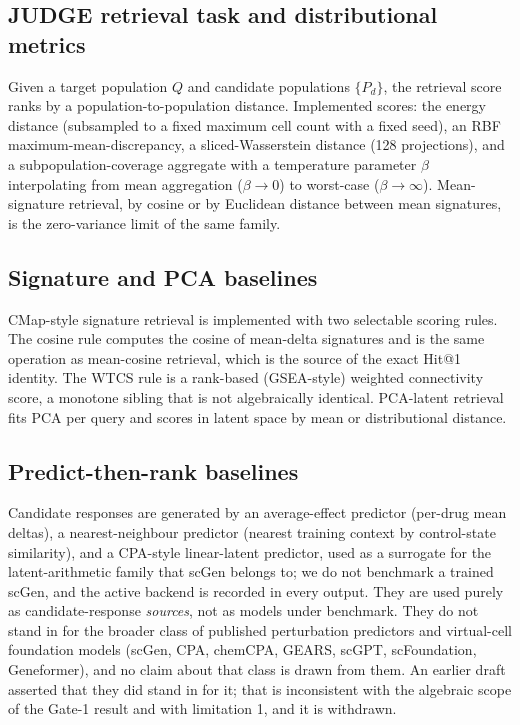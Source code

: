\documentclass[11pt,letterpaper]{article}
\begin{document}
\subsection*{JUDGE retrieval task and distributional metrics}

Given a target population $Q$ and candidate populations $\{P_d\}$, the retrieval score ranks by a
population-to-population distance. Implemented scores: the energy distance\cite{EnergyDistance} (subsampled to a fixed maximum cell
count with a fixed seed), an RBF maximum-mean-discrepancy\cite{MMD}, a
sliced-Wasserstein distance (128 projections)\cite{SlicedWasserstein}, and a
subpopulation-coverage aggregate with a temperature parameter $\beta$
interpolating from mean aggregation ($\beta \to 0$) to worst-case
($\beta \to \infty$). Mean-signature retrieval, by cosine or by Euclidean distance between
mean signatures, is the zero-variance limit of the same family.

\subsection*{Signature and PCA baselines}

CMap-style signature retrieval is implemented with two selectable scoring rules. The
cosine rule computes the cosine of mean-delta signatures and is the same operation as
mean-cosine retrieval, which is the source of the exact Hit@1 identity. The WTCS rule is a
rank-based (GSEA-style) weighted connectivity score, a monotone sibling that is not
algebraically identical. PCA-latent retrieval fits PCA per query and scores in latent space
by mean or distributional distance.

\subsection*{Predict-then-rank baselines}

Candidate responses are generated by an average-effect predictor (per-drug mean
deltas), a nearest-neighbour predictor (nearest training context by control-state
similarity), and a CPA-style linear-latent predictor, used as a surrogate for
the latent-arithmetic family that scGen\cite{ref4} belongs to; we do not benchmark a trained
scGen, and the active backend is recorded in every output. They are used purely as
candidate-response \emph{sources}, not as models under benchmark. They do not stand in
for the broader class of published perturbation predictors and virtual-cell foundation models
(scGen\cite{ref4}, CPA\cite{ref5}, chemCPA\cite{ref6}, GEARS\cite{ref10}, scGPT\cite{ref7},
scFoundation\cite{ref8}, Geneformer\cite{ref9}), and no claim about that class is drawn from
them. An earlier draft asserted that they did stand in for it; that is inconsistent with the
algebraic scope of the Gate-1 result and with limitation 1, and it is withdrawn.
\end{document}
